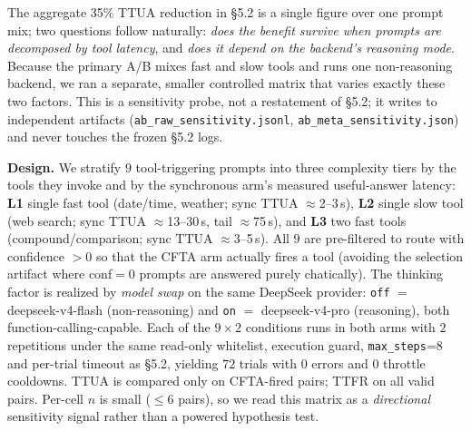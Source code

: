 \documentclass[numbered,mediumone,traditional]{oup-authoring-template}
\begin{document}
The aggregate 35\% TTUA reduction in \S5.2 is a single figure over one prompt mix; two questions follow naturally: \emph{does the benefit survive when prompts are decomposed by tool latency}, and \emph{does it depend on the backend's reasoning mode}. Because the primary A/B mixes fast and slow tools and runs one non-reasoning backend, we ran a separate, smaller controlled matrix that varies exactly these two factors. This is a sensitivity probe, not a restatement of \S5.2; it writes to independent artifacts (\texttt{ab\_raw\_sensitivity.jsonl}, \texttt{ab\_meta\_sensitivity.json}) and never touches the frozen \S5.2 logs.

\textbf{Design.} We stratify $9$ tool-triggering prompts into three complexity tiers by the tools they invoke and by the synchronous arm's measured useful-answer latency: \textbf{L1} single fast tool (date/time, weather; sync TTUA $\approx$2--3\,s), \textbf{L2} single slow tool (web search; sync TTUA $\approx$13--30\,s, tail $\approx$75\,s), and \textbf{L3} two fast tools (compound/comparison; sync TTUA $\approx$3--5\,s). All $9$ are pre-filtered to route with confidence $>0$ so that the CFTA arm actually fires a tool (avoiding the selection artifact where conf$=$0 prompts are answered purely chatically). The thinking factor is realized by \emph{model swap} on the same DeepSeek provider: \texttt{off} $=$ deepseek-v4-flash (non-reasoning) and \texttt{on} $=$ deepseek-v4-pro (reasoning), both function-calling-capable. Each of the $9\times2$ conditions runs in both arms with $2$ repetitions under the same read-only whitelist, execution guard, \texttt{max\_steps}=8 and per-trial timeout as \S5.2, yielding $72$ trials with $0$ errors and $0$ throttle cooldowns. TTUA is compared only on CFTA-fired pairs; TTFR on all valid pairs. Per-cell $n$ is small ($\le 6$ pairs), so we read this matrix as a \emph{directional} sensitivity signal rather than a powered hypothesis test.
\end{document}
